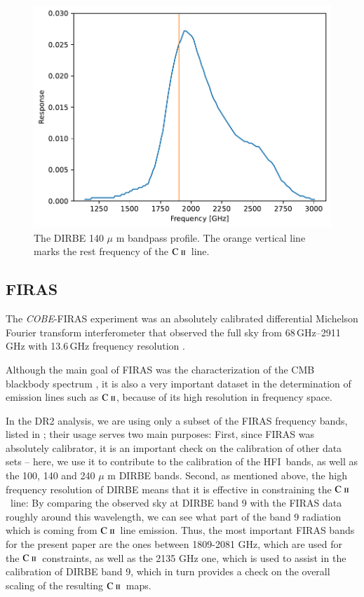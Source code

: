 \documentclass{aa}
\newcommand{\mathsc}[1]{{\normalfont\textsc{#1}}}
\def\COBE{\textit{COBE}}
\newcommand{\cii}{\ensuremath{\mathsc {C\ ii}}}
\newcommand{\hfi}[0]{HFI}
\begin{document}
\begin{figure}
    \centering
    \includegraphics[width=\columnwidth]{figures/dirbe_09_bandpass_vs_cii.pdf}
    \caption{The DIRBE 140 $\mu$ m bandpass profile. The orange vertical line marks the rest frequency of the \cii\ line.}
    \label{fig:140_bp}
\end{figure}

\subsection{FIRAS}
The \COBE-FIRAS experiment was an absolutely calibrated differential Michelson Fourier transform interferometer that observed the full sky from 68\,GHz--2911\,GHz with 13.6\,GHz frequency resolution \citep{fixsen:1994,mather:1999}. 

Although the main goal of FIRAS was the characterization of the CMB blackbody spectrum \citep{mather:1994}, it is also a very important dataset in the determination of emission lines such as \cii, because of its high resolution in frequency space.

In the DR2 analysis, we are using only a subset of the FIRAS frequency bands, listed in \citet{CG02_01}; their usage serves two main purposes: First, since FIRAS was absolutely calibrator, it is an important check on the calibration of other data sets -- here, we use it to contribute to the calibration of the \hfi\ bands, as well as the 100, 140 and 240 $\mu$ m DIRBE bands. Second, as mentioned above, the high frequency resolution of DIRBE means that it is effective in constraining the \cii\ line: By comparing the observed sky at DIRBE band 9 with the FIRAS data roughly around this wavelength, we can see what part of the band 9 radiation which is coming from \cii\ line emission. Thus, the most important FIRAS bands for the present paper are the ones between 1809-2081 GHz, which are used for the \cii\ constraints, as well as the 2135 GHz one, which is used to assist in the calibration of DIRBE band 9, which in turn provides a check on the overall scaling of the resulting \cii\ maps.
\end{document}
